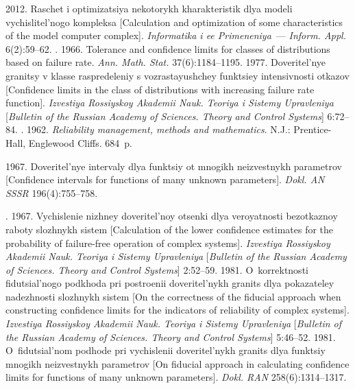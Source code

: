 \begin{multicols}{2}
{{\begin{thebibliography}{99}
 2012. Raschet i optimizatsiya nekotorykh kharakteristik 
dlya modeli vychislitel'nogo kompleksa
[Calculation and optimization of some characteristics of the model computer complex].
\textit{Informatika i ee 
Primeneniya}~--- \textit{Inform. Appl.} 6(2):59--62.
. 1966. Tolerance and confidence limits for 
classes of distributions based on failure rate. \textit{Ann. Math. Stat.} 
37(6):1184--1195. 
 1977. Doveritel'nye granitsy v klasse raspredeleniy s 
vozrastayushchey funktsiey intensivnosti otkazov
[Confidence limits in the class of distributions with increasing failure rate function].
\textit{Izvestiya Rossiyskoy 
Akademii Nauk. Teoriya i Sistemy Upravleniya} 
[\textit{Bulletin of the Russian Academy of Sciences. Theory and Control Systems}]
6:72--84.
. 1962. \textit{Reliability management, 
methods and mathematics}. N.J.: Prentice-Hall, Englewood Cliffs. 684~p.

 1967. Doveritel'nye intervaly dlya funk\-tsiy ot mnogikh 
neizvestnykh parametrov
[Confidence intervals for functions of many unknown parameters].
 \textit{Dokl. AN SSSR} 196(4):755--758.
 
. 1967. Vychislenie 
nizhney doveritel'noy otsenki dlya ve\-ro\-yat\-nosti bezotkaznoy raboty slozhnykh 
sistem  [Calculation of the lower confidence estimates for the probability of failure-free operation of complex systems].
\textit{Izvestiya Rossiyskoy Akademii Nauk. Teoriya i Sistemy 
Upravleniya} [\textit{Bulletin of the Russian Academy of Sciences. Theory and Control Systems}]
2:52--59.
 1981. O~korrektnosti fidutsial'nogo podkhoda pri 
postroenii doveritel'nykh granits dlya pokazateley nadezhnosti slozhnykh sistem
[On the correctness of the fiducial approach when constructing confidence limits for the indicators of reliability of complex systems].
\textit{Izvestiya Rossiyskoy Akademii Nauk. Teoriya i Sistemy Upravleniya}
[\textit{Bulletin of the Russian Academy of Sciences. Theory and Control Systems}] 
5:46--52.
 1981. O~fidutsial'nom podhode pri vychislenii 
doveritel'nykh granits dlya funktsiy mnogikh neizvestnykh parametrov
[On fiducial approach in calculating confidence limits for functions of many unknown parameters].
\textit{Dokl. RAN}  258(6):1314--1317. 

\end{thebibliography}
} }


\end{multicols}

